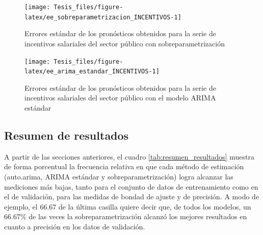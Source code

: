 \documentclass[
]{article}
\begin{document}
\begin{figure}[H]
\texttt{[image: Tesis\_files/figure-latex/ee\_sobreparametrizacion\_INCENTIVOS-1]} \caption{Errores estándar de los pronósticos obtenidos para la serie de incentivos salariales del sector público con sobreparametrización}\label{fig:ee_sobreparametrizacion_INCENTIVOS}
\end{figure}

\begin{figure}[H]
\texttt{[image: Tesis\_files/figure-latex/ee\_arima\_estandar\_INCENTIVOS-1]} \caption{Errores estándar de los pronósticos obtenidos para la serie de incentivos salariales del sector público con el modelo ARIMA estándar}\label{fig:ee_arima_estandar_INCENTIVOS}
\end{figure}

\subsection{Resumen de resultados}

A partir de las secciones anteriores, el cuadro
\ref{tab:resumen_resultados} muestra de forma porcentual la frecuencia
relativa en que cada método de estimación (auto.arima, ARIMA estándar y
sobreparametrización) logra alcanzar las mediciones más bajas, tanto
para el conjunto de datos de entrenamiento como en el de validación,
para las medidas de bondad de ajuste y de precisión. A modo de ejemplo,
el 66.67 de la última casilla quiere decir que, de todos los modelos, un
66.67\% de las veces la sobreparametrización alcanzó los mejores
resultados en cuanto a precisión en los datos de validación.

\begin{table}[H]

\caption{\label{tab:unnamed-chunk-38}\label{tab:resumen_resultados}Distribución porcentual de los métodos de estimación que alcanzaron los mejores resultados según conjunto de datos y tipo de medición}
\centering
{}
\end{table}
\end{document}
